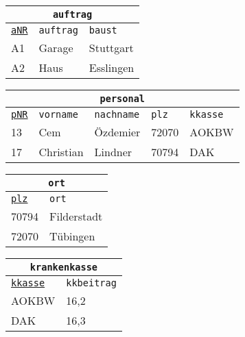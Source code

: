 \begin{Answer}[ref=Normal1]
	\begin{minipage}{\textwidth}
		\begin{minipage}{0.33\textwidth}
			\begin{tabular}{lll}
				\multicolumn{3}{c}{\lstinline!auftrag!}\\
				\hline
				\underline{\lstinline!aNR!}&\lstinline!auftrag!&\lstinline!baust!\\
				\hline
				A1&Garage&Stuttgart\\
				A2&Haus&Esslingen\\
			\end{tabular}
		\end{minipage}
		\begin{minipage}{0.66\textwidth}
			\begin{tabular}{lllll}
				\multicolumn{5}{c}{\lstinline!personal!}\\
				\hline
				\underline{\lstinline!pNR!}&\lstinline!vorname!&\lstinline!nachname!&\lstinline!plz!&\lstinline!kkasse!\\
				\hline
				13&Cem&Özdemier&72070&AOKBW\\
				17&Christian&Lindner&70794&DAK\\
			\end{tabular}
		\end{minipage}
	\end{minipage}
	\begin{minipage}{\textwidth}
		\begin{minipage}{0.33\textwidth}
			\begin{tabular}{ll}
				\multicolumn{2}{c}{\lstinline!ort!}\\
				\hline
				\underline{\lstinline!plz!}&\lstinline!ort!\\
				\hline
				70794&Filderstadt\\
				72070&Tübingen\\
			\end{tabular}
		\end{minipage}
		\begin{minipage}{0.66\textwidth}
			\begin{tabular}{ll}
				\multicolumn{2}{c}{\lstinline!krankenkasse!}\\
				\hline
				\underline{\lstinline!kkasse!}&\lstinline!kkbeitrag!\\
				\hline
				AOKBW&16,2\\
				DAK&16,3\\
			\end{tabular}
		\end{minipage}
	\end{minipage}
\end{Answer}
